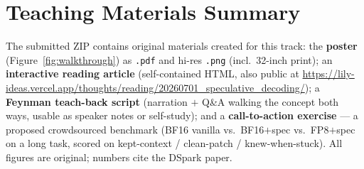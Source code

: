 \documentclass{article}
\begin{document}
\section{Teaching Materials Summary}
The submitted ZIP contains original materials created for this track: the \textbf{poster} (Figure~\ref{fig:walkthrough}) as \texttt{.pdf} and hi-res \texttt{.png} (incl.\ 32-inch print); an \textbf{interactive reading article} (self-contained HTML, also public at \url{https://lily-ideas.vercel.app/thoughts/reading/20260701_speculative_decoding/}); a \textbf{Feynman teach-back script} (narration $+$ Q\&A walking the concept both ways, usable as speaker notes or self-study); and a \textbf{call-to-action exercise} --- a proposed crowdsourced benchmark (BF16 vanilla vs.\ BF16$+$spec vs.\ FP8$+$spec on a long task, scored on kept-context / clean-patch / knew-when-stuck). All figures are original; numbers cite the DSpark paper.
\end{document}
